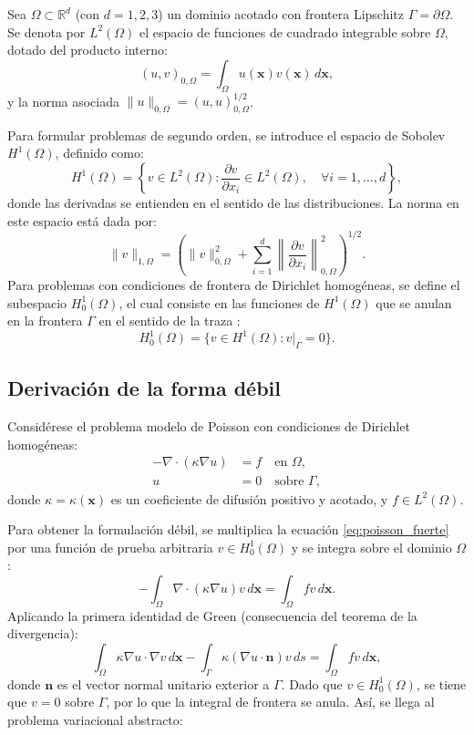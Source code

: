 \documentclass[12pt, letterpaper]{report}
\theoremstyle{definition}
\begin{document}
Sea $\Omega \subset \mathbb{R}^d$ (con $d=1, 2, 3$) un dominio acotado con frontera Lipschitz $\Gamma = \partial \Omega$. Se denota por $L^2(\Omega)$ el espacio de funciones de cuadrado integrable sobre $\Omega$, dotado del producto interno:
\[
(u, v)_{0,\Omega} = \int_{\Omega} u(\mathbf{x}) v(\mathbf{x}) \, d\mathbf{x},
\]
y la norma asociada $\|u\|_{0,\Omega} = (u, u)_{0,\Omega}^{1/2}$.

Para formular problemas de segundo orden, se introduce el espacio de Sobolev $H^1(\Omega)$, definido como:
\[
H^1(\Omega) = \left\{ v \in L^2(\Omega) : \frac{\partial v}{\partial x_i} \in L^2(\Omega), \quad \forall i=1,\dots,d \right\},
\]
donde las derivadas se entienden en el sentido de las distribuciones. La norma en este espacio está dada por:
\[
\|v\|_{1,\Omega} = \left( \|v\|_{0,\Omega}^2 + \sum_{i=1}^d \left\| \frac{\partial v}{\partial x_i} \right\|_{0,\Omega}^2 \right)^{1/2}.
\]
Para problemas con condiciones de frontera de Dirichlet homogéneas, se define el subespacio $H^1_0(\Omega)$, el cual consiste en las funciones de $H^1(\Omega)$ que se anulan en la frontera $\Gamma$ en el sentido de la traza \cite{adams2003sobolev}:
\[
H^1_0(\Omega) = \{ v \in H^1(\Omega) : v|_{\Gamma} = 0 \}.
\]

\subsection{Derivación de la forma débil}

Considérese el problema modelo de Poisson con condiciones de Dirichlet homogéneas:
\begin{equation}\label{eq:poisson_fuerte}
    \begin{aligned}
        -\nabla \cdot (\kappa \nabla u) &= f \quad \text{en } \Omega, \\
        u &= 0 \quad \text{sobre } \Gamma,
    \end{aligned}
\end{equation}
donde $\kappa = \kappa(\mathbf{x})$ es un coeficiente de difusión positivo y acotado, y $f \in L^2(\Omega)$.

Para obtener la formulación débil, se multiplica la ecuación \eqref{eq:poisson_fuerte} por una función de prueba arbitraria $v \in H^1_0(\Omega)$ y se integra sobre el dominio $\Omega$:
\[
-\int_{\Omega} \nabla \cdot (\kappa \nabla u) v \, d\mathbf{x} = \int_{\Omega} f v \, d\mathbf{x}.
\]
Aplicando la primera identidad de Green (consecuencia del teorema de la divergencia):
\[
\int_{\Omega} \kappa \nabla u \cdot \nabla v \, d\mathbf{x} - \int_{\Gamma} \kappa (\nabla u \cdot \mathbf{n}) v \, ds = \int_{\Omega} f v \, d\mathbf{x},
\]
donde $\mathbf{n}$ es el vector normal unitario exterior a $\Gamma$. Dado que $v \in H^1_0(\Omega)$, se tiene que $v = 0$ sobre $\Gamma$, por lo que la integral de frontera se anula. Así, se llega al problema variacional abstracto:
\end{document}
